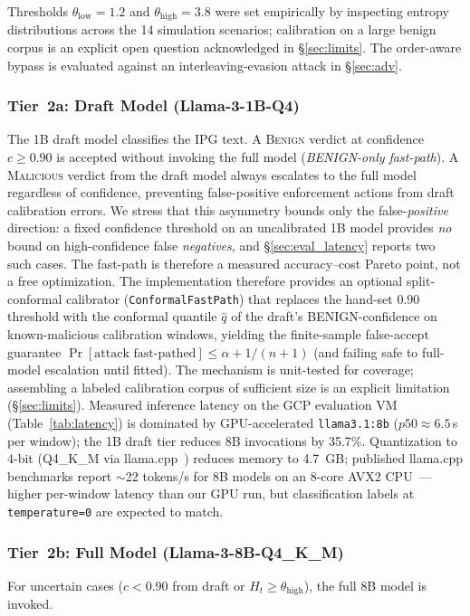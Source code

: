 \documentclass[journal]{IEEEtran}
\newcommand{\ipg}{IPG}
\begin{document}
Thresholds $\theta_{\text{low}}=1.2$ and $\theta_{\text{high}}=3.8$ were set
empirically by inspecting entropy distributions across the 14 simulation
scenarios; calibration on a large benign corpus is an explicit open question
acknowledged in \S\ref{sec:limits}.  The order-aware bypass is evaluated
against an interleaving-evasion attack in \S\ref{sec:adv}.

\subsubsection*{Tier~2a: Draft Model (Llama-3-1B-Q4)}
The 1B draft model classifies the \ipg{} text.  A \textsc{Benign} verdict
at confidence $c \geq 0.90$ is accepted without invoking the full model
(\emph{BENIGN-only fast-path}).  A \textsc{Malicious} verdict from the draft
model always escalates to the full model regardless of confidence, preventing
false-positive enforcement actions from draft calibration errors.  We stress
that this asymmetry bounds only the false-\emph{positive} direction: a fixed
confidence threshold on an uncalibrated 1B model provides \emph{no} bound on
high-confidence false \emph{negatives}, and \S\ref{sec:eval_latency} reports
two such cases.  The fast-path is therefore a measured accuracy--cost
Pareto point, not a free optimization.  The implementation therefore
provides an optional split-conformal calibrator
(\texttt{ConformalFastPath}) that replaces the hand-set $0.90$ threshold
with the conformal quantile $\hat q$ of the draft's BENIGN-confidence on
known-malicious calibration windows, yielding the finite-sample false-accept
guarantee $\Pr[\text{attack fast-pathed}] \leq \alpha + 1/(n{+}1)$ (and
failing safe to full-model escalation until fitted).  The mechanism is
unit-tested for coverage; assembling a labeled calibration corpus of
sufficient size is an explicit limitation (\S\ref{sec:limits}).
Measured inference latency on the GCP evaluation VM (Table~\ref{tab:latency})
is dominated by GPU-accelerated \texttt{llama3.1:8b} ($p50 \approx 6.5$\,s
per window); the 1B draft tier reduces 8B invocations by 35.7\%.
Quantization to 4-bit (Q4\_K\_M via llama.cpp~\cite{llamacpp}) reduces memory
to 4.7~GB; published llama.cpp benchmarks report $\sim$22 tokens/s for 8B
models on an 8-core AVX2 CPU~\cite{llamacpp}---higher per-window latency
than our GPU run, but classification labels at \texttt{temperature=0} are
expected to match.

\subsubsection*{Tier~2b: Full Model (Llama-3-8B-Q4\_K\_M)}
For uncertain cases ($c < 0.90$ from draft or $H_t \geq \theta_{\text{high}}$),
the full 8B model is invoked.
\end{document}
